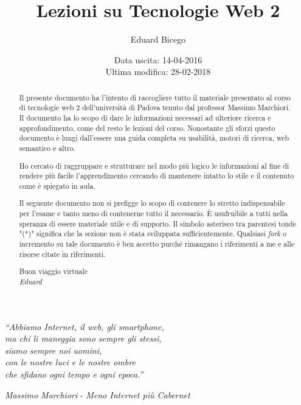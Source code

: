 \documentclass[a4paper,11pt]{report}
\begin{document}
\title{Lezioni su Tecnologie Web 2}
\author{Eduard Bicego}
\date{Data uscita: 14-04-2016 \\ Ultima modifica: 28-02-2018}

\maketitle

%

\begin{abstract}
	Il presente documento ha l'intento di raccogliere tutto il materiale presentato al corso di tecnologie web 2 dell'università di Padova tenuto dal professor Massimo Marchiori. Il documento ha lo scopo di dare le informazioni necessari ad ulteriore ricerca e approfondimento, come del resto le lezioni del corso. Nonostante gli sforzi questo documento è lungi dall'essere una guida completa su usabilità, motori di ricerca, web semantico e altro. \par
	
	Ho cercato di raggruppare e strutturare nel modo più logico le informazioni al fine di rendere più facile l'apprendimento cercando di mantenere intatto lo stile e il contenuto come è spiegato in aula. \par
	
	Il seguente documento non si prefigge lo scopo di contenere lo stretto indispensabile per l'esame e tanto meno di contenerne tutto il necessario. 
	È usufruibile a tutti nella speranza di essere materiale utile e di supporto. Il simbolo asterisco tra parentesi tonde "(*)" significa che la sezione non è stata sviluppata sufficientemente. Qualsiasi \emph{fork} o incremento su tale documento è ben accetto purché rimangano i riferimenti a me e alle risorse citate in riferimenti.
	\begin{flushright}
		Buon viaggio virtuale \\
		\emph{Eduard}
	\end{flushright}
	
	
\end{abstract}

\hypersetup{linkcolor=black}
\tableofcontents
\listoffigures

\newpage
	\begin{center}
		\emph{``Abbiamo Internet, il web, gli smartphone,\\
		 ma chi li maneggia sono sempre gli stessi,\\
		  siamo sempre noi uomini, \\
		  con le nostre luci e le nostre ombre \\
		  che sfidano ogni tempo e ogni epoca.''\\}
	\end{center}
	\begin{flushright}
		\emph{Massimo Marchiori} - \emph{Meno Internet più Cabernet}	
	\end{flushright}
\end{document}
